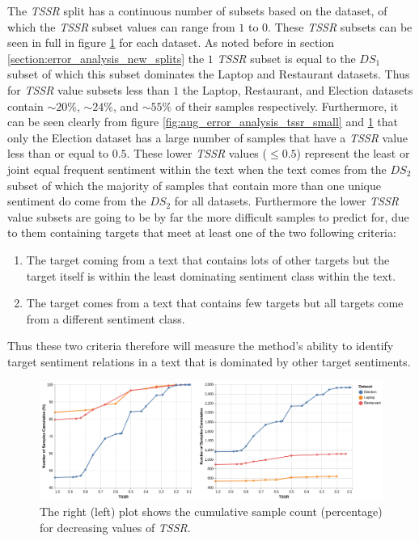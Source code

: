 The \textit{TSSR} split has a continuous number of subsets based on the dataset, of which the \textit{TSSR} subset values can range from $1$ to $0$. These \textit{TSSR} subsets can be seen in full in figure \ref{fig:aug_error_analysis_tssr_full} for each dataset. As noted before in section \ref{section:error_analysis_new_splits} the $1$ \textit{TSSR} subset is equal to the $DS_1$ subset of which this subset dominates the Laptop and Restaurant datasets. Thus for \textit{TSSR} value subsets less than $1$ the Laptop, Restaurant, and Election datasets contain $\sim20\%$, $\sim24\%$, and $\sim55\%$ of their samples respectively. Furthermore, it can be seen clearly from figure \ref{fig:aug_error_analysis_tssr_small} and \ref{fig:aug_error_analysis_tssr_full} that only the Election dataset has a large number of samples that have a \textit{TSSR} value less than or equal to $0.5$. These lower \textit{TSSR} values ($\leq 0.5$) represent the least or joint equal frequent sentiment within the text when the text comes from the $DS_2$ subset of which the majority of samples that contain more than one unique sentiment do come from the $DS_2$ for all datasets. Furthermore the lower \textit{TSSR} value subsets are going to be by far the more difficult samples to predict for, due to them containing targets that meet at least one of the two following criteria:
\begin{enumerate}
    \item The target coming from a text that contains lots of other targets but the target itself is within the least dominating sentiment class within the text.
    \item The target comes from a text that contains few targets but all targets come from a different sentiment class.
\end{enumerate}
Thus these two criteria therefore will measure the method's ability to identify target sentiment relations in a text that is dominated by other target sentiments.

\begin{figure}[!ht]
    \centering
    \includegraphics[scale=0.42]{images/augmentation/error_analysis/tssr_full_range.png}
    \caption{The right (left) plot shows the cumulative sample count (percentage) for decreasing values of \textit{TSSR}.}
    \label{fig:aug_error_analysis_tssr_full}
\end{figure}

